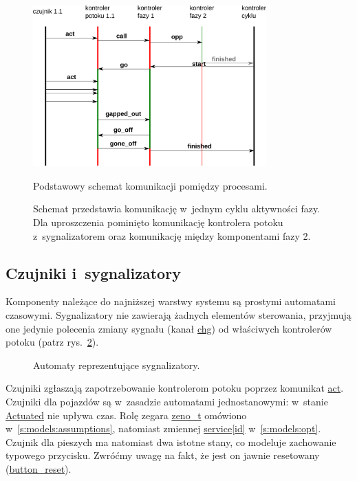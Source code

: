 \documentclass{pracamgr}
\newcommand{\imgr}[1]{rys.~\ref{#1}}
\theoremstyle{plain}
\begin{document}
\begin{figure}
  \centering
  \includegraphics[width=0.8\textwidth]{img/models-msc}
  \caption{Podstawowy schemat komunikacji pomiędzy procesami.}
  \caption*{Schemat przedstawia komunikację w~jednym cyklu aktywności
    fazy. Dla uproszczenia pominięto komunikację kontrolera potoku
    z~sygnalizatorem oraz komunikację między komponentami fazy 2.}
  \label{img:models:msc}
\end{figure}

\subsection{Czujniki i~sygnalizatory}
\label{ss:models:models:dets}
Komponenty należące do najniższej warstwy systemu są prostymi
automatami czasowymi.
Sygnalizatory nie zawierają żadnych elementów sterowania, przyjmują
one jedynie polecenia zmiany sygnału (kanał \url{chg}) od właściwych
kontrolerów potoku (patrz \imgr{img:lights}).

\begin{figure}
  \centering
  \hspace{1cm}
  \caption{Automaty reprezentujące sygnalizatory.}
  \label{img:lights}
\end{figure}

Czujniki zgłaszają zapotrzebowanie kontrolerom potoku poprzez
komunikat \url{act}. Czujniki dla pojazdów są w~zasadzie automatami
jednostanowymi: w~stanie \url{Actuated} nie upływa czas. Rolę
zegara \url{zeno_t} omówiono w~\ref{s:models:assumptions}, natomiast
zmiennej \url{service[id]} w~\ref{s:models:opt}. Czujnik dla pieszych
ma natomiast dwa istotne stany, co modeluje zachowanie typowego
przycisku. Zwróćmy uwagę na fakt, że jest on jawnie resetowany
(\url{button_reset}).
\end{document}
